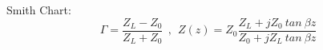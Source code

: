 \par
Smith Chart:
$${\Gamma} = \frac{Z_L - Z_0}{Z_L+Z_0} ~~ , ~~ Z(z) = Z_0 \frac{Z_L + jZ_0~tan~\beta z}{Z_0 + jZ_L~tan~\beta z}$$
\hspace{.02\textwidth}

\par
\setlength{\parindent}{0.0cm} %
